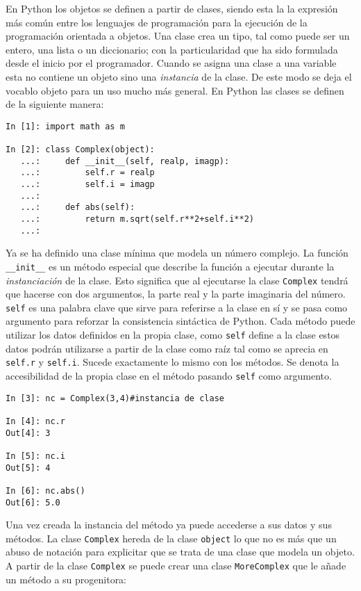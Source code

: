 \documentclass[a4paper,10pt]{article}
\begin{document}
En Python los objetos se definen a partir de clases, siendo esta la
la expresión más común entre los lenguajes de programación para la
ejecución de la programación orientada a objetos.  Una clase crea un
tipo, tal como puede ser un entero, una lista o un diccionario; con la
particularidad que ha sido formulada desde el inicio por el
programador.  Cuando se asigna una clase a una variable esta no
contiene un objeto sino una \emph{instancia} de la clase.  De este
modo se deja el vocablo objeto para un uso mucho más general.  En
Python las clases se definen de la siguiente manera:

\begin{lstlisting}
In [1]: import math as m

In [2]: class Complex(object):
   ...:     def __init__(self, realp, imagp):
   ...:         self.r = realp
   ...:         self.i = imagp
   ...:
   ...:     def abs(self):
   ...:         return m.sqrt(self.r**2+self.i**2)
   ...:
\end{lstlisting}

Ya se ha definido una clase mínima que modela un número complejo.  La
función \texttt{\_\_init\_\_} es un método especial que describe la
función a ejecutar durante la \emph{instanciación} de la clase.  Esto
significa que al ejecutarse la clase \texttt{Complex} tendrá que
hacerse con dos argumentos, la parte real y la parte imaginaria del
número. \texttt{self} es una palabra clave que sirve para referirse a
la clase en sí y se pasa como argumento para reforzar la consistencia
sintáctica de Python.  Cada método puede utilizar los datos definidos
en la propia clase, como \texttt{self} define a la clase estos datos
podrán utilizarse a partir de la clase como raíz tal como se aprecia
en \texttt{self.r} y \texttt{self.i}.  Sucede exactamente lo mismo con
los métodos. Se denota la accesibilidad de la propia clase en el
método pasando \texttt{self} como argumento.

\begin{lstlisting}
In [3]: nc = Complex(3,4)#instancia de clase

In [4]: nc.r
Out[4]: 3

In [5]: nc.i
Out[5]: 4

In [6]: nc.abs()
Out[6]: 5.0
\end{lstlisting} 

Una vez creada la instancia del método ya puede accederse a sus datos
y sus métodos.  La clase \texttt{Complex} hereda de la clase
\texttt{object} lo que no es más que un abuso de notación para
explicitar que se trata de una clase que modela un objeto.  A partir
de la clase \texttt{Complex} se puede crear una clase
\texttt{MoreComplex} que le añade un método a su progenitora:
\end{document}
